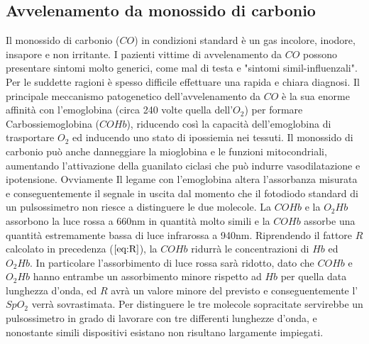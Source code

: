 \documentclass[12pt,a4paper, twoside, openright]{report}
\begin{document}
\subsection{Avvelenamento da monossido di carbonio}

Il monossido di carbonio ($CO$) in condizioni standard è un gas incolore, inodore, insapore e non irritante. 
I pazienti vittime di avvelenamento da $CO$ possono presentare sintomi molto generici, come mal di testa e "sintomi simil-influenzali". 
Per le suddette ragioni è spesso difficile effettuare una rapida e chiara diagnosi. 
Il principale meccanismo patogenetico dell'avvelenamento da $CO$ è la sua enorme affinità con l'emoglobina (circa 240 volte quella dell'$O_2$) per formare Carbossiemoglobina ($COHb$), riducendo così la capacità dell'emoglobina di trasportare $O_2$ ed inducendo uno stato di ipossiemia nei tessuti. 
Il monossido di carbonio può anche danneggiare la mioglobina e le funzioni mitocondriali, aumentando l'attivazione della guanilato ciclasi che può indurre vasodilatazione e ipotensione. 
Ovviamente Il legame con l'emoglobina altera l'assorbanza misurata e conseguentemente il segnale in uscita dal momento che il fotodiodo standard di un pulsossimetro non riesce a distinguere le due molecole. 
La $COHb$ e la  $O_2Hb$ assorbono la luce rossa a 660nm in quantità molto simili e la $COHb$ assorbe una quantità estremamente bassa di luce infrarossa a 940nm. 
Riprendendo il fattore $R$ calcolato in precedenza ($\ref{eq:R}$), la $COHb$ ridurrà le concentrazioni di $Hb$ ed $O_2Hb$. 
In particolare l'assorbimento di luce rossa sarà ridotto, dato che $COHb$ e $O_2Hb$ hanno entrambe un assorbimento minore rispetto ad $Hb$ per quella data lunghezza d'onda, ed $R$ avrà un valore minore del previsto e conseguentemente l'$SpO_2$ verrà sovrastimata. 
Per distinguere le tre molecole sopracitate servirebbe un pulsossimetro in grado di lavorare con tre differenti lunghezze d'onda, e nonostante simili dispositivi esistano non risultano largamente impiegati.
\end{document}
